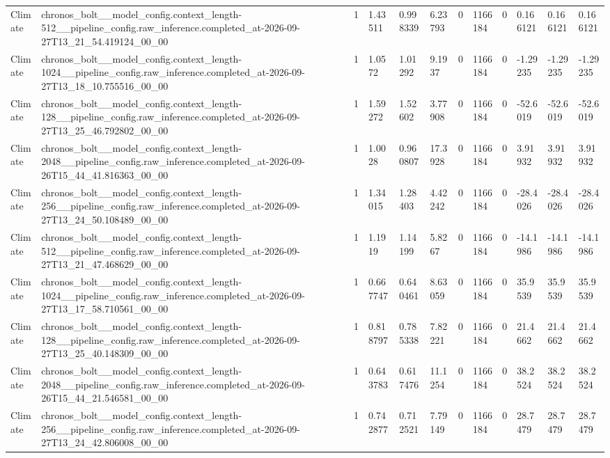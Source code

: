 \begin{tabular}{llllllllllll}
Climate & chronos\_bolt\_\_model\_config.context\_length-512\_\_pipeline\_config.raw\_inference.completed\_at-2026-09-27T13\_21\_54.419124\_00\_00 & 1 & 1.43511 & 0.998339 & 6.23793 & 0 & 1166184 & 0 & 0.166121 & 0.166121 & 0.166121 \\
Climate & chronos\_bolt\_\_model\_config.context\_length-1024\_\_pipeline\_config.raw\_inference.completed\_at-2026-09-27T13\_18\_10.755516\_00\_00 & 1 & 1.0572 & 1.01292 & 9.1937 & 0 & 1166184 & 0 & -1.29235 & -1.29235 & -1.29235 \\
Climate & chronos\_bolt\_\_model\_config.context\_length-128\_\_pipeline\_config.raw\_inference.completed\_at-2026-09-27T13\_25\_46.792802\_00\_00 & 1 & 1.59272 & 1.52602 & 3.77908 & 0 & 1166184 & 0 & -52.6019 & -52.6019 & -52.6019 \\
Climate & chronos\_bolt\_\_model\_config.context\_length-2048\_\_pipeline\_config.raw\_inference.completed\_at-2026-09-26T15\_44\_41.816363\_00\_00 & 1 & 1.0028 & 0.960807 & 17.3928 & 0 & 1166184 & 0 & 3.91932 & 3.91932 & 3.91932 \\
Climate & chronos\_bolt\_\_model\_config.context\_length-256\_\_pipeline\_config.raw\_inference.completed\_at-2026-09-27T13\_24\_50.108489\_00\_00 & 1 & 1.34015 & 1.28403 & 4.42242 & 0 & 1166184 & 0 & -28.4026 & -28.4026 & -28.4026 \\
Climate & chronos\_bolt\_\_model\_config.context\_length-512\_\_pipeline\_config.raw\_inference.completed\_at-2026-09-27T13\_21\_47.468629\_00\_00 & 1 & 1.1919 & 1.14199 & 5.8267 & 0 & 1166184 & 0 & -14.1986 & -14.1986 & -14.1986 \\
Climate & chronos\_bolt\_\_model\_config.context\_length-1024\_\_pipeline\_config.raw\_inference.completed\_at-2026-09-27T13\_17\_58.710561\_00\_00 & 1 & 0.667747 & 0.640461 & 8.63059 & 0 & 1166184 & 0 & 35.9539 & 35.9539 & 35.9539 \\
Climate & chronos\_bolt\_\_model\_config.context\_length-128\_\_pipeline\_config.raw\_inference.completed\_at-2026-09-27T13\_25\_40.148309\_00\_00 & 1 & 0.818797 & 0.785338 & 7.82221 & 0 & 1166184 & 0 & 21.4662 & 21.4662 & 21.4662 \\
Climate & chronos\_bolt\_\_model\_config.context\_length-2048\_\_pipeline\_config.raw\_inference.completed\_at-2026-09-26T15\_44\_21.546581\_00\_00 & 1 & 0.643783 & 0.617476 & 11.1254 & 0 & 1166184 & 0 & 38.2524 & 38.2524 & 38.2524 \\
Climate & chronos\_bolt\_\_model\_config.context\_length-256\_\_pipeline\_config.raw\_inference.completed\_at-2026-09-27T13\_24\_42.806008\_00\_00 & 1 & 0.742877 & 0.712521 & 7.79149 & 0 & 1166184 & 0 & 28.7479 & 28.7479 & 28.7479 \\

\end{tabular}
